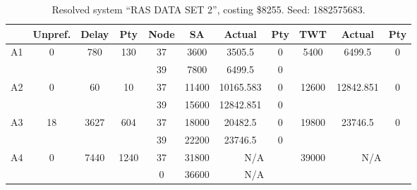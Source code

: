 \begin{sidewaystable}
\footnotesize
\caption{Resolved system ``RAS DATA SET 2'', costing \$8255. Seed: 1882575683.}
\centering
\begin{tabular}{c||c|c|c||c|c|c|c||c|c|c}
  \hline \hline
  &
  Unpref. & 
  Delay &
  Pty &
  Node &
  SA &
  Actual &
  Pty &
  TWT &
  Actual &
  Pty \\
      \hline
      \multirow{2}{*}{A1} &
      \multirow{2}{*}{0} &
      \multirow{2}{*}{780} &
      \multirow{2}{*}{130} &
      37 &
      3600 &
        3505.5 &
        0 &
      \multirow{2}{*}{5400} &
        \multirow{2}{*}{6499.5} &
        \multirow{2}{*}{0}
      \\
      \cline{5-8}
       &
       &
       &
       &
      39 &
      7800 &
        6499.5 &
        0 &
      
         &
        
      \\
      \hline
      \multirow{2}{*}{A2} &
      \multirow{2}{*}{0} &
      \multirow{2}{*}{60} &
      \multirow{2}{*}{10} &
      37 &
      11400 &
        10165.583 &
        0 &
      \multirow{2}{*}{12600} &
        \multirow{2}{*}{12842.851} &
        \multirow{2}{*}{0}
      \\
      \cline{5-8}
       &
       &
       &
       &
      39 &
      15600 &
        12842.851 &
        0 &
      
         &
        
      \\
      \hline
      \multirow{2}{*}{A3} &
      \multirow{2}{*}{18} &
      \multirow{2}{*}{3627} &
      \multirow{2}{*}{604} &
      37 &
      18000 &
        20482.5 &
        0 &
      \multirow{2}{*}{19800} &
        \multirow{2}{*}{23746.5} &
        \multirow{2}{*}{0}
      \\
      \cline{5-8}
       &
       &
       &
       &
      39 &
      22200 &
        23746.5 &
        0 &
      
         &
        
      \\
      \hline
      \multirow{2}{*}{A4} &
      \multirow{2}{*}{0} &
      \multirow{2}{*}{7440} &
      \multirow{2}{*}{1240} &
      37 &
      31800 &
        \multicolumn{2}{|c||}{N/A} &
      \multirow{2}{*}{39000} &
        \multicolumn{2}{c}{\multirow{2}{*}{N/A}}
      \\
      \cline{5-8}
       &
       &
       &
       &
      0 &
      36600 &
        \multicolumn{2}{|c||}{N/A} &
      

\end{tabular}
\end{sidewaystable}
